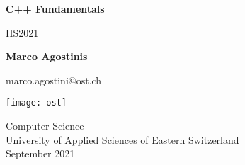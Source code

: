 \begin{titlepage}
    \begin{center}
        \vspace*{1cm}
            
        \Huge
        \textbf{C++ Fundamentals}
            
        \vspace{0.5cm}
        \LARGE
        HS2021
            
        \vspace{1.5cm}
            
        \textbf{Marco Agostinis} 
        \vspace{0.5cm}
        
        \small{marco.agostini@ost.ch}
            
        \vfill
            
    
        \texttt{[image: ost]}
           
        \vspace{2cm}
           
        \Large
        Computer Science \\
        University of Applied Sciences of Eastern Switzerland \\
        September 2021
        

    \end{center}
\end{titlepage}

\pagebreak
